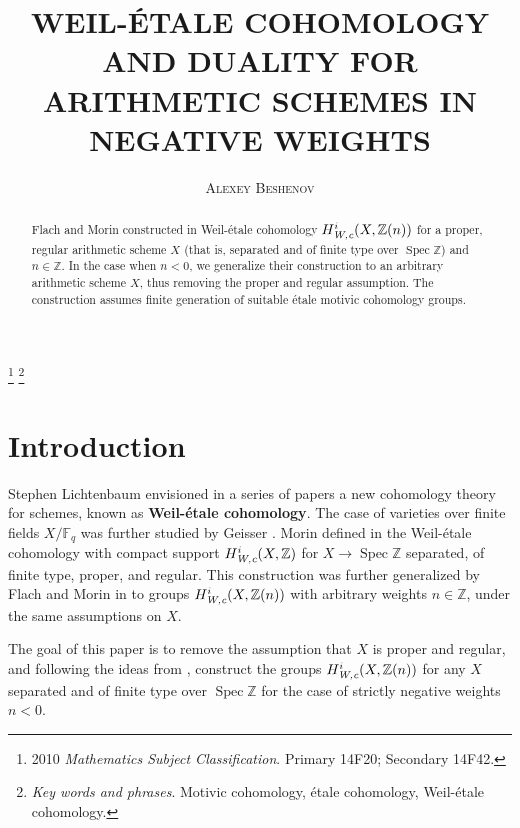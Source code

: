 \documentclass[leqno,12pt]{article}
\title{\uppercase{Weil-\'{e}tale cohomology and duality for arithmetic schemes
    in negative weights}}
\author{\textsc{Alexey Beshenov}}
\date{}
\theoremstyle{plain}
\theoremstyle{definition}
\DeclareMathOperator{\Spec}{Spec}
\newcommand{\FF}{\mathbb{F}}
\newcommand{\ZZ}{\mathbb{Z}}
\newcommand{\Wc}{\text{\it W,c}}
\begin{document}
\maketitle

\footnote{ %
2010 \textit{Mathematics Subject Classification}.
Primary 14F20; Secondary 14F42.}
\footnote{ %
  \textit{Key words and phrases}.
  Motivic cohomology, \'{e}tale cohomology, Weil-\'{e}tale cohomology.}


\begin{abstract}
  Flach and Morin constructed in \cite{Flach-Morin-2018} Weil-\'{e}tale
  cohomology $H^i_\Wc (X, \ZZ(n))$ for a proper, regular arithmetic scheme $X$
  (that is, separated and of finite type over $\Spec \ZZ$) and $n \in \ZZ$.
  In the case when $n < 0$, we generalize their construction to an arbitrary
  arithmetic scheme $X$, thus removing the proper and regular assumption.
  The construction assumes finite generation of suitable \'{e}tale motivic
  cohomology groups.
\end{abstract}

\section{Introduction}
\label{sec:introduction}

Stephen Lichtenbaum envisioned in a series of papers
\cite{Lichtenbaum-2005,Lichtenbaum-2009-Euler-char,Lichtenbaum-2009-number-rings}
a new cohomology theory for schemes, known as
\textbf{Weil-\'{e}tale cohomology}. The case of varieties over finite fields
$X/\FF_q$ was further studied by Geisser
\cite{Geisser-2004,Geisser-2006,Geisser-2010-arithmetic-homology}. Morin defined
in \cite{Morin-2014} the Weil-\'{e}tale cohomology with compact support
$H^i_\Wc (X, \ZZ)$ for $X \to \Spec\ZZ$ separated, of finite type, proper, and
regular. This construction was further generalized by Flach and Morin in
\cite{Flach-Morin-2018} to groups $H^i_\Wc (X, \ZZ(n))$ with arbitrary weights
$n \in \ZZ$, under the same assumptions on $X$.

The goal of this paper is to remove the assumption that $X$ is proper and
regular, and following the ideas from \cite{Flach-Morin-2018}, construct the
groups $H^i_\Wc (X, \ZZ(n))$ for any $X$ separated and of finite type over
$\Spec\ZZ$ for the case of strictly negative weights $n < 0$.
\end{document}
